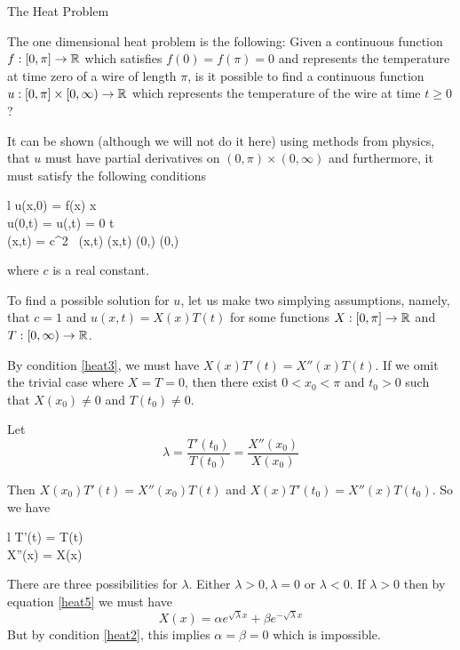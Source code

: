 \begin{section}{The Heat Problem}

The one dimensional heat problem is the following:
Given a continuous function $f:[0,\pi] \to \mathbb{R}$
which satisfies $f(0) = f(\pi) = 0$ and represents
the temperature at time zero of a wire of length
$\pi$, is it possible to find a
continuous function $u:[0,\pi] \times [0,\infty)
\to \mathbb{R}$ which represents the temperature of the
wire at time $t \geq 0$?

It can be shown (although we will not do it here) using
methods from physics, that $u$ must have partial derivatives
on $(0,\pi) \times (0,\infty)$ and furthermore, it must
satisfy the following conditions

	\begin{IEEEeqnarray}{l}
		u(x,0) = f(x)  x \in [0,\pi] \\ \label{heat1}
		u(0,t) = u(\pi,t) = 0  t  \label{heat2} \\
		(x,t) = c^2 \,
			(x,t)
			 (x,t) \in 
			(0,\pi) \times (0,\infty) \label{heat3}
	\end{IEEEeqnarray}
where $c$ is a real constant.

To find a possible solution for $u$, let us make two
simplying assumptions, namely, that $c = 1$ and $u(x,t)
= X(x)T(t)$ for some functions $X:[0,\pi] \to \mathbb{R}$ and
$T:[0,\infty) \to \mathbb{R}$.

By condition \ref{heat3}, we must have $X(x)T'(t) =
X''(x)T(t)$. If we omit the trivial case where $X =
T = 0$, then there exist $0 < x_0 < \pi$ and $t_0 > 0$
such that $X(x_0) \neq 0$ and $T(t_0) \neq 0$.

Let
	\begin{displaymath}
		\lambda = \frac{T'(t_0)}{T(t_0)}
			= \frac{X''(x_0)}{X(x_0)}
	\end{displaymath}
	
Then $X(x_0)T'(t) = X''(x_0)T(t)$ and $X(x)T'(t_0)
= X''(x)T(t_0)$. So we have
	\begin{IEEEeqnarray}{l}
		T'(t) = \lambda T(t)  \label{heat4} \\
		X''(x) = \lambda X(x) \label{heat5}
	\end{IEEEeqnarray}


There are three possibilities for $\lambda$. Either
$\lambda > 0, \lambda = 0$ or $\lambda < 0$. If
$\lambda > 0$ then by equation \ref{heat5} we must have
	\begin{displaymath}
		X(x) = \alpha e^{\sqrt{\lambda}x}
			+ \beta e^{-\sqrt{\lambda}x}
	\end{displaymath}
But by condition \ref{heat2}, this implies $\alpha =
\beta = 0$ which is impossible.


\end{section}
